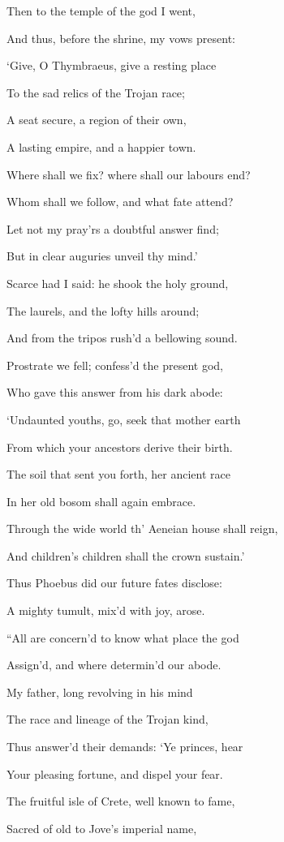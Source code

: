 Then to the temple of the god I went,

And thus, before the shrine, my vows present:

‘Give, O Thymbraeus, give a resting place

To the sad relics of the Trojan race;

A seat secure, a region of their own,

A lasting empire, and a happier town.

Where shall we fix? where shall our labours end?

Whom shall we follow, and what fate attend?

Let not my pray’rs a doubtful answer find;

But in clear auguries unveil thy mind.’

Scarce had I said: he shook the holy ground,

The laurels, and the lofty hills around;

And from the tripos rush’d a bellowing sound.

Prostrate we fell; confess’d the present god,

Who gave this answer from his dark abode:

‘Undaunted youths, go, seek that mother earth

From which your ancestors derive their birth.

The soil that sent you forth, her ancient race

In her old bosom shall again embrace.

Through the wide world th’ Aeneian house shall reign,

And children’s children shall the crown sustain.’

Thus Phoebus did our future fates disclose:

A mighty tumult, mix’d with joy, arose.

“All are concern’d to know what place the god

Assign’d, and where determin’d our abode.

My father, long revolving in his mind

The race and lineage of the Trojan kind,

Thus answer’d their demands: ‘Ye princes, hear

Your pleasing fortune, and dispel your fear.

The fruitful isle of Crete, well known to fame,

Sacred of old to Jove’s imperial name,

